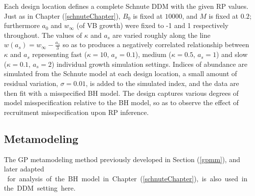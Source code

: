 %
Each design location defines a complete Schnute DDM with
the given RP values. Just as in Chapter (\ref{schnuteChapter}), $B_0$ is fixed 
at $10000$, and $M$ is fixed at $0.2$; furthermore $a_0$ and $w_\infty$ (of VB 
growth) were fixed to -1 and 1 respectively throughout.
The values of $\kappa$ and $a_s$ are varied roughly along the line $w(a_s)=w_\infty-\frac{a_s}{3}$ 
so as to produces a negatively correlated relationship between $\kappa$ and 
$a_s$ representing fast ($\kappa=10$,  $a_s=0.1$), medium ($\kappa=0.5$,  $a_s=1$) and 
slow ($\kappa=0.1$,  $a_s=2$) individual growth simulation settings.
Indices of abundance are simulated from the Schnute model at each design 
location, a small amount of residual variation, $\sigma = 0.01$,
is added to the simulated index, and the data are then fit with a misspecified
BH model. The design captures various degrees of model misspecification
relative to the BH model, so as to observe the effect of recruitment
misspecification upon RP inference.

%

%
\subsection{Metamodeling}

%
The GP metamodeling method previously developed in Section (\ref{gpmm}), and later adapted 
\mbox{%
for analysis of the BH model in Chapter (\ref{schnuteChapter}), 
is also used in the DDM setting here.
}


